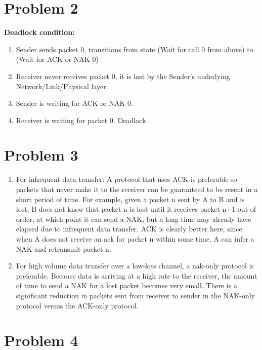 \documentclass[letter,10pt]{article}
\begin{document}
\section{Problem 2}
\textbf{Deadlock condition:}
\begin{enumerate}
	\item Sender sends packet 0, transitions from state (Wait for call 0 from above) to (Wait for ACK or NAK 0)
	\item Receiver never receives packet 0, it is lost by the Sender's underlying Network/Link/Physical layer.
	\item Sender is waiting for ACK or NAK 0.
	\item Receiver is waiting for packet 0. Deadlock.
\end{enumerate}

\section{Problem 3}

\begin{enumerate}
	\item For infrequent data transfer: A protocol that uses ACK is preferable so packets that never make it to the receiver can be guaranteed to be resent in a short period of time. For example, given a packet n sent by A to B and is lost, B does not know that packet n is lost until it receives packet n+1 out of order, at which point it can send a NAK, but a long time may already have elapsed due to infrequent data transfer. ACK is clearly better here, since when A does not receive an ack for packet n within some time, A can infer a NAK and retransmit packet n.
	
	\item For high volume data transfer over a low-loss channel, a nak-only protocol is preferable. Because data is arriving at a high rate to the receiver, the amount of time to send a NAK for a lost packet becomes very small. There is a significant reduction in packets sent from receiver to sender in the NAK-only protocol versus the ACK-only protocol.
\end{enumerate}

\section{Problem 4}
\end{document}
